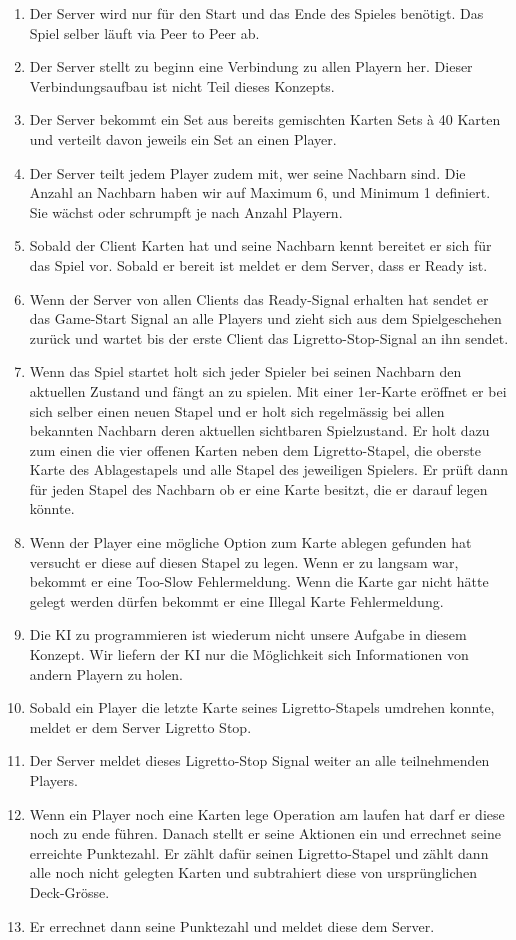 \begin{enumerate}
	\item Der Server wird nur für den Start und das Ende des Spieles benötigt. Das Spiel selber läuft via Peer to Peer ab.
	\item Der Server stellt zu beginn eine Verbindung zu allen Playern her. Dieser Verbindungsaufbau ist nicht Teil dieses Konzepts.
	\item Der Server bekommt ein Set aus bereits gemischten Karten Sets à 40 Karten und verteilt davon jeweils ein Set an einen Player.
	\item Der Server teilt jedem Player zudem mit, wer seine Nachbarn sind. Die Anzahl an Nachbarn haben wir auf Maximum 6, und Minimum 1 definiert. Sie wächst oder schrumpft je nach Anzahl Playern.
	\item Sobald der Client Karten hat und seine Nachbarn kennt bereitet er sich für das Spiel vor. Sobald er bereit ist meldet er dem Server, dass er Ready ist.
	\item Wenn der Server von allen Clients das Ready-Signal erhalten hat sendet er das Game-Start Signal an alle Players und zieht sich aus dem Spielgeschehen zurück und wartet bis der erste Client das Ligretto-Stop-Signal an ihn sendet.
	\item Wenn das Spiel startet holt sich jeder Spieler bei seinen Nachbarn den aktuellen Zustand und fängt an zu spielen. Mit einer 1er-Karte eröffnet er bei sich selber einen neuen Stapel und er holt sich regelmässig bei allen bekannten Nachbarn deren aktuellen sichtbaren Spielzustand. Er holt dazu zum einen die vier offenen Karten neben dem Ligretto-Stapel, die oberste Karte des Ablagestapels und alle Stapel des jeweiligen Spielers. Er prüft dann für jeden Stapel des Nachbarn ob er eine Karte besitzt, die er darauf legen könnte.
	\item Wenn der Player eine mögliche Option zum Karte ablegen gefunden hat versucht er diese auf diesen Stapel zu legen. Wenn er zu langsam war, bekommt er eine Too-Slow Fehlermeldung. Wenn die Karte gar nicht hätte gelegt werden dürfen bekommt er eine Illegal Karte Fehlermeldung.
	\item Die KI zu programmieren ist wiederum nicht unsere Aufgabe in diesem Konzept. Wir liefern der KI nur die Möglichkeit sich Informationen von andern Playern zu holen.
	\item Sobald ein Player die letzte Karte seines Ligretto-Stapels umdrehen konnte, meldet er dem Server Ligretto Stop. 
	\item Der Server meldet dieses Ligretto-Stop Signal weiter an alle teilnehmenden Players.
	\item Wenn ein Player noch eine Karten lege Operation am laufen hat darf er diese noch zu ende führen. Danach stellt er seine Aktionen ein und errechnet seine erreichte Punktezahl. Er zählt dafür seinen Ligretto-Stapel und zählt dann alle noch nicht gelegten Karten und subtrahiert diese von ursprünglichen Deck-Grösse.
	\item Er errechnet dann seine Punktezahl und meldet diese dem Server.
\end{enumerate}


